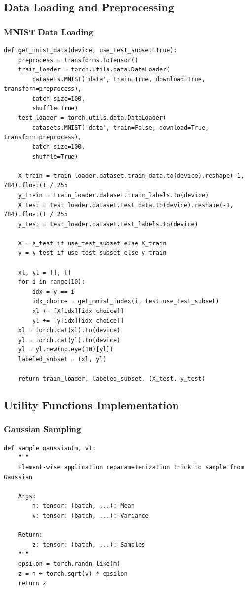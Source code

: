 \documentclass{article}
\begin{document}
\subsection{Data Loading and Preprocessing}

\subsubsection{MNIST Data Loading}

\begin{verbatim}
def get_mnist_data(device, use_test_subset=True):
    preprocess = transforms.ToTensor()
    train_loader = torch.utils.data.DataLoader(
        datasets.MNIST('data', train=True, download=True, transform=preprocess),
        batch_size=100,
        shuffle=True)
    test_loader = torch.utils.data.DataLoader(
        datasets.MNIST('data', train=False, download=True, transform=preprocess),
        batch_size=100,
        shuffle=True)

    X_train = train_loader.dataset.train_data.to(device).reshape(-1, 784).float() / 255
    y_train = train_loader.dataset.train_labels.to(device)
    X_test = test_loader.dataset.test_data.to(device).reshape(-1, 784).float() / 255
    y_test = test_loader.dataset.test_labels.to(device)

    X = X_test if use_test_subset else X_train
    y = y_test if use_test_subset else y_train

    xl, yl = [], []
    for i in range(10):
        idx = y == i
        idx_choice = get_mnist_index(i, test=use_test_subset)
        xl += [X[idx][idx_choice]]
        yl += [y[idx][idx_choice]]
    xl = torch.cat(xl).to(device)
    yl = torch.cat(yl).to(device)
    yl = yl.new(np.eye(10)[yl])
    labeled_subset = (xl, yl)

    return train_loader, labeled_subset, (X_test, y_test)
\end{verbatim}

\subsection{Utility Functions Implementation}

\subsubsection{Gaussian Sampling}

\begin{verbatim}
def sample_gaussian(m, v):
    """
    Element-wise application reparameterization trick to sample from Gaussian

    Args:
        m: tensor: (batch, ...): Mean
        v: tensor: (batch, ...): Variance

    Return:
        z: tensor: (batch, ...): Samples
    """
    epsilon = torch.randn_like(m)
    z = m + torch.sqrt(v) * epsilon
    return z
\end{verbatim}
\end{document}
